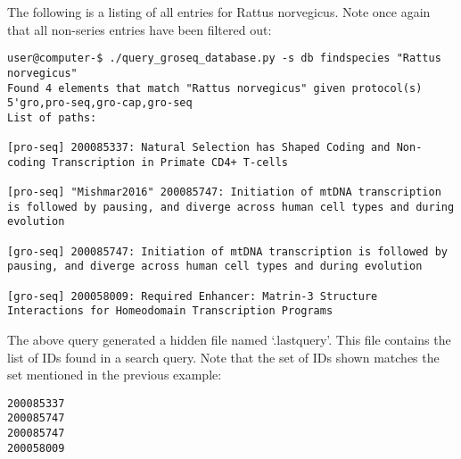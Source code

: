 \documentclass[12pt,letterpaper]{article}
\begin{document}
The following is a listing of all entries for Rattus norvegicus. Note once again
that all non-series entries have been filtered out:
\begin{verbatim}
user@computer-$ ./query_groseq_database.py -s db findspecies "Rattus norvegicus"
Found 4 elements that match "Rattus norvegicus" given protocol(s) 5'gro,pro-seq,gro-cap,gro-seq
List of paths:

[pro-seq] 200085337: Natural Selection has Shaped Coding and Non-coding Transcription in Primate CD4+ T-cells

[pro-seq] "Mishmar2016" 200085747: Initiation of mtDNA transcription is followed by pausing, and diverge across human cell types and during evolution

[gro-seq] 200085747: Initiation of mtDNA transcription is followed by pausing, and diverge across human cell types and during evolution

[gro-seq] 200058009: Required Enhancer: Matrin-3 Structure Interactions for Homeodomain Transcription Programs
\end{verbatim}

The above query generated a hidden file named `.lastquery'. This file contains the list of IDs found in a search query. Note that the set
of IDs shown matches the set mentioned in the previous example:
\begin{verbatim}
200085337
200085747
200085747
200058009
\end{verbatim}
\end{document}
